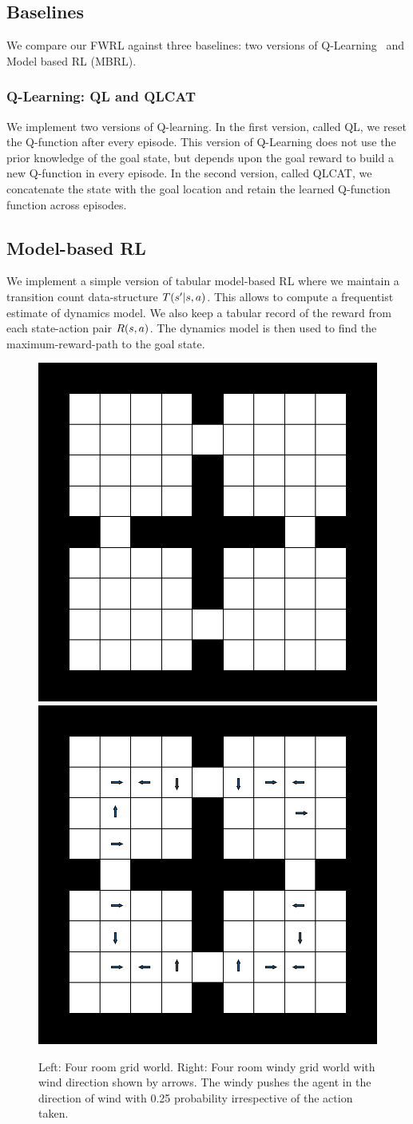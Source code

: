 \subsection{Baselines}
We compare our FWRL against three baselines: two versions of
Q-Learning~\cite{watkins1992qlearning} and Model based RL (MBRL).

\subsubsection{Q-Learning: QL and QLCAT}
We implement two versions of Q-learning. In the first version, called QL, we
reset the Q-function after every episode. This version of Q-Learning does not
use the prior knowledge of the goal state, but depends upon the goal reward to
build a new Q-function in every episode. In the second version, called QLCAT,
we concatenate the state with the goal location and retain the learned Q-function
function across episodes. 

\subsection{Model-based RL}
We implement a simple version of tabular model-based RL where we maintain a
transition count data-structure $T(s' | s, a)$.
This allows to compute a frequentist estimate of dynamics model.
We also keep a tabular record of the reward from each state-action pair
$R(s, a)$. The dynamics model is then used to find the
maximum-reward-path to the goal state.


%
\begin{figure}[h!]%
\includegraphics[width=0.48\columnwidth]{media/4-room-grid-world.pdf}
\hfill
\includegraphics[width=0.48\columnwidth]{media/4-room-windy-world.pdf}%
\caption{Left: Four room grid world. Right: Four room windy grid world with wind direction shown by arrows. The windy pushes the agent in the direction of wind with 0.25 probability irrespective of the action taken.}
\label{fig:four-room-grid-world}%
\end{figure}%
%
